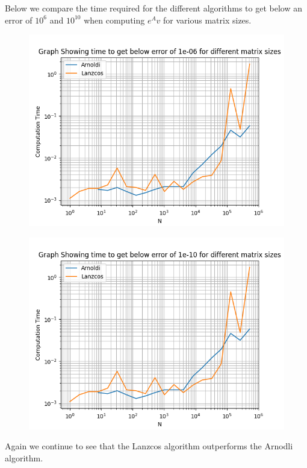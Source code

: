 \documentclass{article}
\begin{document}
Below we compare the time required for the different algorithms to get below an error of $10^6$ and $10^{10}$ when computing $e^Av$ for various matrix sizes.
\begin{figure}[H]
\includegraphics[width=\linewidth]{Plots/time to get below an error of 1e-06.png}
\end{figure}
\begin{figure}[H]
\includegraphics[width=\linewidth]{Plots/time to get below an error of 1e-10.png}
\end{figure}
Again we continue to see that the Lanzcos algorithm outperforms the Arnodli algorithm.
\clearpage
\newpage


\end{document}
